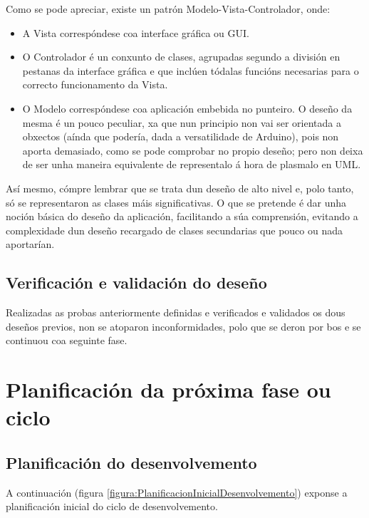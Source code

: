   Como se pode apreciar, existe un patrón Modelo-Vista-Controlador, onde:

  \begin{itemize}
   \item A Vista correspóndese coa interface gráfica ou GUI.
   \item O Controlador é un conxunto de clases, agrupadas segundo a división en
         pestanas da interface gráfica e que inclúen tódalas funcións
         necesarias para o correcto funcionamento da Vista.
   \item O Modelo correspóndese coa aplicación embebida no punteiro. O deseño
         da mesma é un pouco peculiar, xa que nun principio non vai ser
         orientada a obxectos (aínda que podería, dada a versatilidade de
         Arduino), pois non aporta demasiado, como se pode comprobar no propio
         deseño; pero non deixa de ser unha maneira equivalente de representalo
         á hora de plasmalo en UML.
  \end{itemize}

  Así mesmo, cómpre lembrar que se trata dun deseño de alto nivel e, polo
  tanto, só se representaron as clases máis significativas. O que se pretende é
  dar unha noción básica do deseño da aplicación, facilitando a súa
  comprensión, evitando a complexidade dun deseño recargado de clases
  secundarias que pouco ou nada aportarían.

 \subsection{Verificación e validación do deseño}

 Realizadas as probas anteriormente definidas e verificados e validados os dous
 deseños previos, non se atoparon inconformidades, polo que se deron por bos e
 se continuou coa seguinte fase.

\section{Planificación da próxima fase ou ciclo}

 \subsection{Planificación do desenvolvemento}

 A continuación (figura \ref{figura:PlanificacionInicialDesenvolvemento})
 exponse a planificación inicial do ciclo de desenvolvemento. \\

